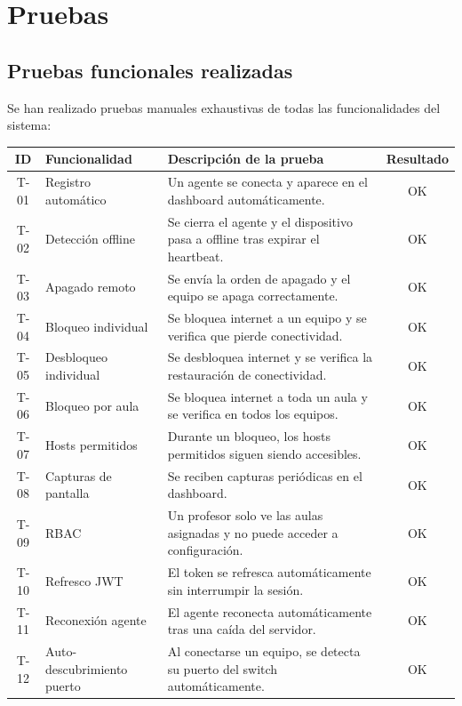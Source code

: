 \documentclass[12pt, a4paper, twoside]{article}
\begin{document}
\section{Pruebas}

\subsection{Pruebas funcionales realizadas}

Se han realizado pruebas manuales exhaustivas de todas las funcionalidades del sistema:

\begin{longtable}{cp{3cm}p{7cm}c}
  \toprule
  \textbf{ID} & \textbf{Funcionalidad} & \textbf{Descripción de la prueba} & \textbf{Resultado} \\
  \midrule
  T-01 & Registro automático & Un agente se conecta y aparece en el dashboard automáticamente. & OK \\
  T-02 & Detección offline & Se cierra el agente y el dispositivo pasa a offline tras expirar el heartbeat. & OK \\
  T-03 & Apagado remoto & Se envía la orden de apagado y el equipo se apaga correctamente. & OK \\
  T-04 & Bloqueo individual & Se bloquea internet a un equipo y se verifica que pierde conectividad. & OK \\
  T-05 & Desbloqueo individual & Se desbloquea internet y se verifica la restauración de conectividad. & OK \\
  T-06 & Bloqueo por aula & Se bloquea internet a toda un aula y se verifica en todos los equipos. & OK \\
  T-07 & Hosts permitidos & Durante un bloqueo, los hosts permitidos siguen siendo accesibles. & OK \\
  T-08 & Capturas de pantalla & Se reciben capturas periódicas en el dashboard. & OK \\
  T-09 & RBAC & Un profesor solo ve las aulas asignadas y no puede acceder a configuración. & OK \\
  T-10 & Refresco JWT & El token se refresca automáticamente sin interrumpir la sesión. & OK \\
  T-11 & Reconexión agente & El agente reconecta automáticamente tras una caída del servidor. & OK \\
  T-12 & Auto-descubrimiento puerto & Al conectarse un equipo, se detecta su puerto del switch automáticamente. & OK \\
  \bottomrule
\end{longtable}
\end{document}
